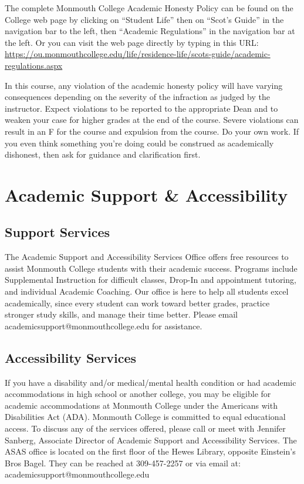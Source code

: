 \documentclass[10pt]{article}
\begin{document}
The complete Monmouth College Academic Honesty Policy can be found on the College web page by clicking on ``Student Life'' then on ``Scot’s Guide'' in the navigation bar to the left, then ``Academic Regulations'' in the navigation bar at the left.  Or you can visit the web page directly by typing in this URL: \url{https://ou.monmouthcollege.edu/life/residence-life/scots-guide/academic-regulations.aspx}

In this course, any violation of the academic honesty policy will have varying consequences depending on the severity of the infraction as judged by the instructor.  Expect violations to be reported to the appropriate Dean and to weaken your case for higher grades at the end of the course. Severe violations can result in an F for the course and expulsion from the course. Do your own work. If you even think something you're doing could be construed as academically dishonest, then ask for guidance and clarification first.


\section{Academic Support \& Accessibility}

\subsection*{Support Services}
The Academic Support and Accessibility Services Office offers free resources to assist Monmouth College students with their academic success. Programs include Supplemental Instruction for difficult classes, Drop-In and appointment tutoring, and individual Academic Coaching. Our office is here to help all students excel academically, since every student can work toward better grades, practice stronger study skills, and manage their time better. Please email academicsupport@monmouthcollege.edu for assistance.

\subsection*{Accessibility Services}
If you have a disability and/or medical/mental health condition or had academic accommodations in high school or another college, you may be eligible for academic accommodations at Monmouth College under the Americans with Disabilities Act (ADA). Monmouth College is committed to equal educational access. To discuss any of the services offered, please call or meet with Jennifer Sanberg, Associate Director of Academic Support and Accessibility Services. The ASAS office is located on the first floor of the Hewes Library, opposite Einstein’s Bros Bagel. They can be reached at 309-457-2257 or via email at: academicsupport@monmouthcollege.edu
\end{document}
